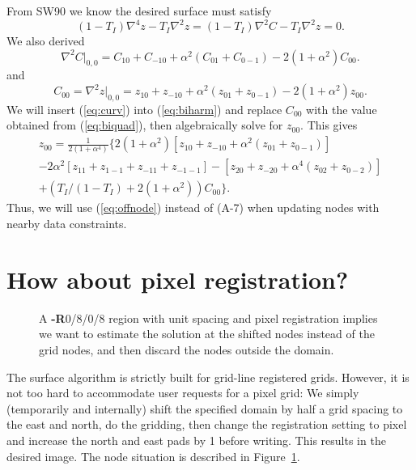\documentclass[12pt,letterpaper,margin=0.5in]{article}
\newcommand{\PDFfig}[4][tbp]{\begin{figure}[#1] \centering \epsfig{figure=#2,width=#4} \caption{{\small #3}} \label{fig:#2} \end{figure}}
\begin{document}
From SW90 we know the desired surface must satisfy
\begin{equation}
\left( 1 - T_I\right)\nabla^4 z - T_I \nabla^2 z = \left( 1 - T_I\right)\nabla^2 C - T_I \nabla^2 z = 0.
\label{eq:biharm}
\end{equation}
We also derived
\begin{equation}
\nabla^2 C \rvert _{0, 0} = C_{10} + C_{-10} + \alpha^2(C_{01} + C_{0-1}) - 2 (1+\alpha^2)C_{00}.
\label{eq:curv}
\end{equation}
and
\begin{equation}
C_{00} = \nabla^2 z \rvert _{0, 0} = z_{10} + z_{-10} + \alpha^2(z_{01} + z_{0-1}) - 2 (1+\alpha^2)z_{00}.
\end{equation}
We will insert (\ref{eq:curv}) into (\ref{eq:biharm}) and replace $C_{00}$ with the value obtained from (\ref{eq:biquad}), then algebraically solve for $z_{00}$.
This gives
\begin{equation}
\begin{split}
z_{00} = \frac{1}{2(1+\alpha^4)} \{ 2(1+\alpha^2) \left [ z_{10}+z_{-10}+\alpha^2(z_{01}+z_{0-1})\right ] \\
	-2\alpha^2\left [z_{11} + z_{1-1} + z_{-11} + z_{-1-1}\right ] - \left [z_{20} + z_{-20} + \alpha^4 (z_{02} + z_{0-2})\right ] \\
	+ \left (T_I/(1-T_I) + 2(1+\alpha^2)\right )C_{00} \}.
\label{eq:offnode}
\end{split}
\end{equation}
Thus, we will use (\ref{eq:offnode}) instead of (A-7) when updating nodes with nearby data constraints.

\section{How about pixel registration?}

\PDFfig[h]{pixelnodes}{A {\bf-R}0/8/0/8 region with unit spacing and pixel registration implies we
want to estimate the solution at the shifted nodes instead of the grid nodes, and then discard the nodes outside the domain.}{5in}
The surface algorithm is strictly built for grid-line registered grids.  However, it is not too hard to
accommodate user requests for a pixel grid: We simply (temporarily and internally) shift the specified domain
by half a grid spacing to the east and north, do the gridding, then change the registration setting to pixel
and increase the north and east pads by 1 before writing.  This results in the desired image. The node situation
is described in Figure~\ref{fig:pixelnodes}. 
\end{document}
